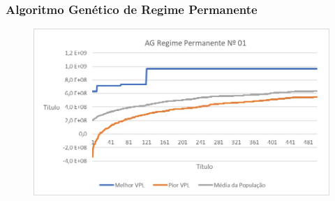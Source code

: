 \documentclass[12pt,a4paper]{report}
\begin{document}
\subsubsection{Algoritmo Genético de Regime Permanente} 

\begin{figure}[H]
\centering

\includegraphics[scale=1]{ApC/AGRP/1}

\end{figure}
\end{document}
